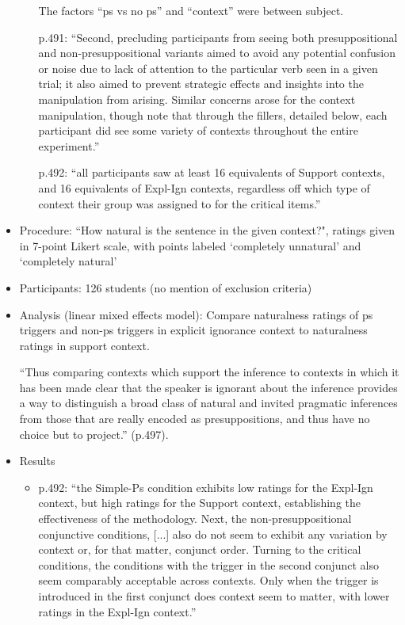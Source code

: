 \documentclass[11pt,fleqn]{article}
\newcommand{\6}{\mbox{$[\hspace*{-.6mm}[$}}
\newcommand{\9}{\mbox{$]\hspace*{-.6mm}]$}}
\begin{document}
\begin{itemize}
\begin{itemize}
The factors ``ps vs no ps'' and ``context'' were between subject.

p.491: ``Second, precluding participants from seeing both presuppositional and non-presuppositional variants aimed to avoid any potential confusion or noise due to lack of attention to the particular verb seen in a given trial; it also aimed to prevent strategic effects and insights into the manipulation from arising. Similar concerns arose for the context manipulation, though note that through the fillers, detailed below, each participant did see some variety of contexts throughout the entire experiment.''

p.492: ``all participants saw at least 16 equivalents of Support contexts, and 16 equivalents of Expl-Ign contexts, regardless off which type of context their group was assigned to for the critical items.''


\end{itemize}

\item Procedure: ``How natural is the sentence in the given context?", ratings given in 7-point Likert scale, with points labeled `completely unnatural' and `completely natural'

\item Participants: 126 students (no mention of exclusion criteria)

\item Analysis (linear mixed effects model): Compare naturalness ratings of ps triggers and non-ps triggers in explicit ignorance context to naturalness ratings in support context.

``Thus comparing contexts which support the inference to contexts in which it has been made clear that the speaker is ignorant about the inference provides a way to distinguish a broad class of natural and invited pragmatic inferences from those that are really encoded as presuppositions, and thus have no choice but to project.'' (p.497).

\item Results

\begin{itemize}

\item p.492: ``the Simple-Ps condition exhibits low ratings for the Expl-Ign context, but high ratings for the Support context, establishing the effectiveness of the methodology. Next, the non-presuppositional conjunctive conditions, [...] also do not seem to exhibit any variation by context or, for that matter, conjunct order. Turning to the critical conditions, the conditions with the trigger in the second conjunct also seem comparably acceptable across contexts. Only when the trigger is introduced in the first conjunct does context seem to matter, with lower ratings in the Expl-Ign context.''


\end{itemize}
\end{itemize}
\end{document}
